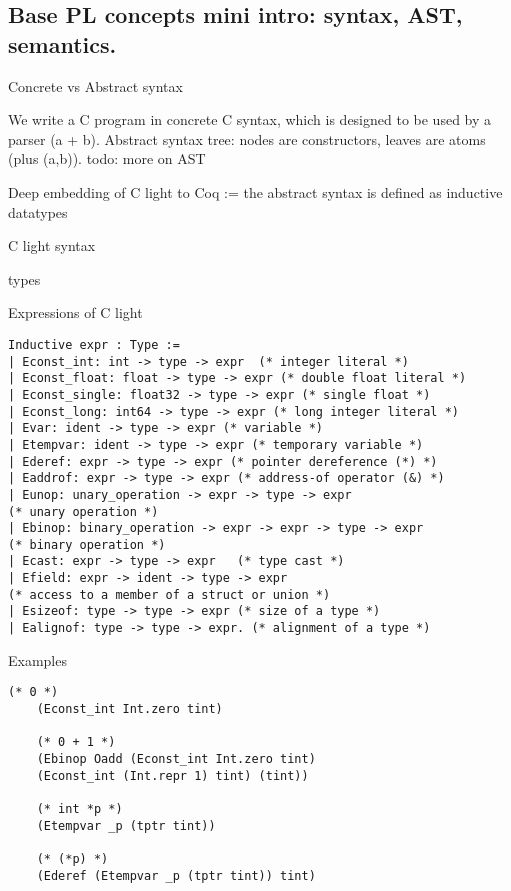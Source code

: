 \documentclass{beamer}
\begin{document}
\subsection{Base PL concepts mini intro: syntax, AST, semantics.}

\begin{frame}
  Concrete vs Abstract syntax

  We write a C program in concrete C syntax, which is designed to be used by a parser (a + b).
  Abstract syntax tree: nodes are constructors, leaves are atoms (plus (a,b)).
  todo: more on AST

  Deep embedding of C light to Coq := the abstract syntax is defined as inductive datatypes
  
\end{frame}
\begin{frame}{C light syntax}
\begin{description}
\item[types]
\end{description}

\end{frame}

\begin{frame}[fragile]{Expressions of C light}
  \begin{lstlisting}[language=Coq]
Inductive expr : Type :=
| Econst_int: int -> type -> expr  (* integer literal *)    
| Econst_float: float -> type -> expr (* double float literal *)
| Econst_single: float32 -> type -> expr (* single float *)
| Econst_long: int64 -> type -> expr (* long integer literal *)
| Evar: ident -> type -> expr (* variable *)
| Etempvar: ident -> type -> expr (* temporary variable *)
| Ederef: expr -> type -> expr (* pointer dereference (*) *)
| Eaddrof: expr -> type -> expr (* address-of operator (&) *)
| Eunop: unary_operation -> expr -> type -> expr
(* unary operation *)
| Ebinop: binary_operation -> expr -> expr -> type -> expr
(* binary operation *)
| Ecast: expr -> type -> expr   (* type cast *)
| Efield: expr -> ident -> type -> expr
(* access to a member of a struct or union *)
| Esizeof: type -> type -> expr (* size of a type *)
| Ealignof: type -> type -> expr. (* alignment of a type *)
\end{lstlisting}


\end{frame}


    

\begin{frame}[fragile]{Examples}

  \begin{lstlisting}[language=Coq]
    (* 0 *)
    (Econst_int Int.zero tint) 

    (* 0 + 1 *)
    (Ebinop Oadd (Econst_int Int.zero tint)
    (Econst_int (Int.repr 1) tint) (tint))

    (* int *p *)
    (Etempvar _p (tptr tint)) 
    
    (* (*p) *)
    (Ederef (Etempvar _p (tptr tint)) tint)


  \end{lstlisting}
  


\end{frame}
\end{document}
